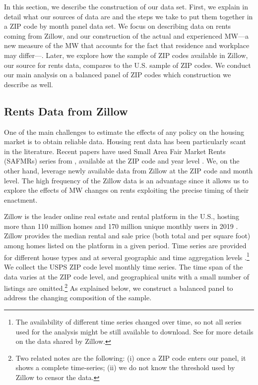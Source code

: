 
In this section, we describe the construction of our data set. First, we explain in detail
what our sources of data are and the steps we take to put them together in a ZIP code
by month panel data set. We focus on describing data on rents coming from Zillow, and our
construction of the actual and experienced MW---a new measure of the MW that accounts
for the fact that residence and workplace may differ---. Later, we explore how the 
sample of ZIP codes available in Zillow, our source for rents data, compares to the 
U.S. sample of ZIP codes. We conduct our main analysis on a balanced panel of ZIP codes 
which construction we describe as well.

\subsection{Rents Data from Zillow}

One of the main challenges to estimate the effects of any policy on the housing market
is to obtain reliable data. Housing rent data has been particularly scant in the 
literature. Recent papers have used Small Area Fair Market Rents (SAFMRs) series from 
\textcite{hud}, available at the ZIP code and year level \parencite{Tidemann2018, 
Yamagishi2019}. We, on the other hand, leverage newly available data from Zillow at the 
ZIP code and month level. The high frequency of the Zillow data is an advantage since it 
allows us to explore the effects of MW changes on rents exploiting the precise timing of 
their enactment.

Zillow is the leader online real estate and rental platform in the U.S., hosting more 
than 110 million homes and 170 million unique monthly users in 2019 
\parencite{ZillowFacts}. Zillow provides the median rental and sale price (both 
total and per square foot) among homes listed on the platform in a given period. Time 
series are provided for different house types and at several geographic and time 
aggregation levels \parencite{ZillowData}.\footnote{The availability of different time 
	series changed over time, so not all series used for the analysis might be still 
	available to download. See \textcite{ZillowData} for more details on the data shared 
	by Zillow.} 
We collect the USPS ZIP code level monthly time series. The time span of the data 
varies at the ZIP code level, and geographical units with a small number of listings
are omitted.\footnote{Two related notes are the following: (i) once a ZIP code enters 
	our panel, it shows a complete time-series; (ii) we do not know the threshold used 
	by Zillow to censor the data.} 
As explained below, we construct a balanced panel to address the changing composition 
of the sample.

